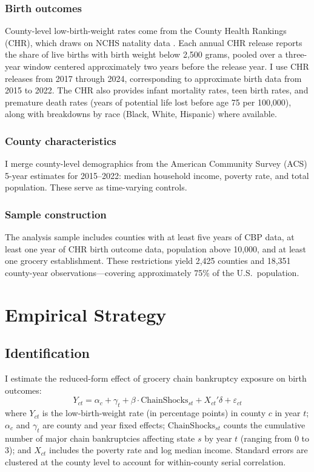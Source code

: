 \documentclass[12pt]{article}
\begin{document}
\subsubsection*{Birth outcomes} County-level low-birth-weight rates come from the County Health Rankings (CHR), which draws on NCHS natality data \citep{remington2015county}. Each annual CHR release reports the share of live births with birth weight below 2,500 grams, pooled over a three-year window centered approximately two years before the release year. I use CHR releases from 2017 through 2024, corresponding to approximate birth data from 2015 to 2022. The CHR also provides infant mortality rates, teen birth rates, and premature death rates (years of potential life lost before age 75 per 100,000), along with breakdowns by race (Black, White, Hispanic) where available.

\subsubsection*{County characteristics} I merge county-level demographics from the American Community Survey (ACS) 5-year estimates for 2015--2022: median household income, poverty rate, and total population. These serve as time-varying controls.

\subsubsection*{Sample construction} The analysis sample includes counties with at least five years of CBP data, at least one year of CHR birth outcome data, population above 10,000, and at least one grocery establishment. These restrictions yield 2,425 counties and 18,351 county-year observations---covering approximately 75\% of the U.S.\ population.



\section{Empirical Strategy}

\subsection{Identification}

I estimate the reduced-form effect of grocery chain bankruptcy exposure on birth outcomes:
\begin{equation}
Y_{ct} = \alpha_c + \gamma_t + \beta \cdot \text{ChainShocks}_{st} + X_{ct}'\delta + \varepsilon_{ct}
\label{eq:main}
\end{equation}
where $Y_{ct}$ is the low-birth-weight rate (in percentage points) in county $c$ in year $t$; $\alpha_c$ and $\gamma_t$ are county and year fixed effects; $\text{ChainShocks}_{st}$ counts the cumulative number of major chain bankruptcies affecting state $s$ by year $t$ (ranging from 0 to 3); and $X_{ct}$ includes the poverty rate and log median income. Standard errors are clustered at the county level to account for within-county serial correlation.
\end{document}
